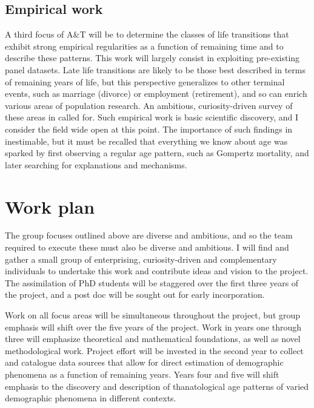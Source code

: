 \documentclass[a4paper,12pt]{article}
\begin{document}
\subsection{Empirical work}
A third focus of A\&T will be to determine the classes of
life transitions that exhibit strong empirical regularities as a function
of remaining time and to describe these patterns. This work will largely consist
in exploiting pre-existing panel datasets. Late life transitions are likely to
be those best described in terms of remaining years of life, but this
perspective generalizes to other terminal events, such as marriage (divorce) or
employment (retirement), and so can enrich various areas of population
research. An ambitious, curiosity-driven survey of these areas in called for.
Such empirical work is basic scientific discovery, and I consider the field wide
open at this point. The importance of such findings in inestimable, but it must
be recalled that everything we know about age was sparked by first observing a
regular age pattern, such as Gompertz mortality, and later
searching for explanations and mechanisms.

\pagebreak
\section{Work plan}
The group focuses outlined above are diverse and
ambitious, and so the team required to execute these must also be diverse and
ambitious. I will find and gather a small group of enterprising, curiosity-driven and complementary individuals to undertake this work and contribute ideas and vision to the project. The assimilation of PhD students will be staggered over the first three years of the project, and a post doc will be sought out for early incorporation.

Work on all focus areas will be simultaneous throughout the project, but group
emphasis will shift over the five years of the project. Work in years one
through three will emphasize theoretical and mathematical foundations, as well
as novel methodological work. Project effort will be invested in the second year
to collect and catalogue data sources that allow for direct estimation of
demographic phenomena as a function of remaining years. Years four and five will shift emphasis to the discovery and description of thanatological age patterns of varied demographic phenomena in different contexts.
\end{document}

